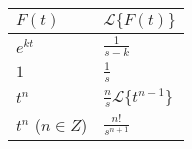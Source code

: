\documentclass{article}
\begin{document}
\begin{tabular}{|l|l|}
  \hline
  $F(t)$ & $\mathcal{L}\{F(t)\}$ \\
  \hline
  $e^{kt}$ & $\frac{1}{s-k}$ \\
  $1$ & $\frac{1}{s}$ \\
  $t^n$ & $\frac{n}{s} \mathcal{L}\{t^{n-1}\}$ \\
  $t^n$ ($n \in Z$) & $\frac{n!}{s^{n+1}}$
\end{tabular}
\end{document}
